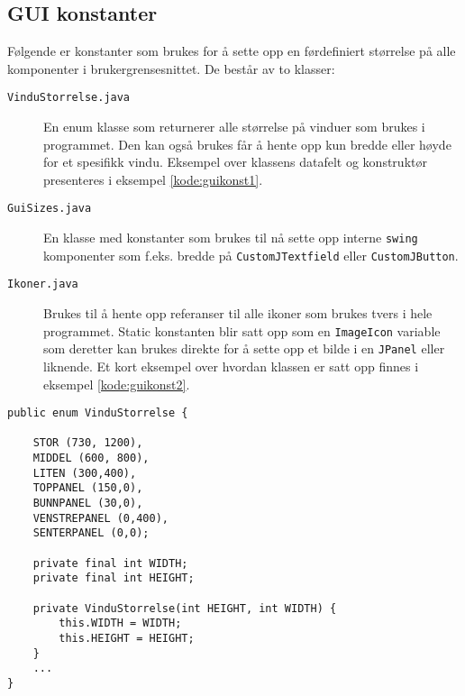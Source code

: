 \subsection{GUI konstanter} \label{subsec:guikonst}
Følgende er konstanter som brukes for å sette opp en førdefiniert størrelse på alle komponenter i brukergrensesnittet. De består av to klasser:
\begin{description}

\item[\texttt{VinduStorrelse.java}]
En enum klasse som returnerer alle størrelse på vinduer som brukes i programmet. Den kan også brukes får å hente opp kun bredde eller høyde for et spesifikk vindu. Eksempel over klassens datafelt og  konstruktør presenteres i eksempel \ref{kode:guikonst1}. 

\item[\texttt{GuiSizes.java}]
En klasse med konstanter som brukes til nå sette opp interne \texttt{swing} komponenter som f.eks. bredde på \texttt{CustomJTextfield} eller \texttt{CustomJButton}.

\item[\texttt{Ikoner.java}]
Brukes til å hente opp referanser til alle ikoner som brukes tvers i hele programmet. Static konstanten blir satt opp som en \texttt{ImageIcon} variable som deretter kan brukes direkte for å sette opp et bilde i en \texttt{JPanel} eller liknende. Et kort eksempel over hvordan klassen er satt opp finnes i eksempel \ref{kode:guikonst2}.
\end{description}

\begin{lstlisting}[caption=Enum klasse for vindustørrelser, label=kode:guikonst1]
public enum VinduStorrelse {

    STOR (730, 1200),
    MIDDEL (600, 800), 
    LITEN (300,400),
    TOPPANEL (150,0),
    BUNNPANEL (30,0),
    VENSTREPANEL (0,400),
    SENTERPANEL (0,0);
    
    private final int WIDTH;
    private final int HEIGHT;

    private VinduStorrelse(int HEIGHT, int WIDTH) {
        this.WIDTH = WIDTH;
        this.HEIGHT = HEIGHT;
    }
	...
}
\end{lstlisting}


